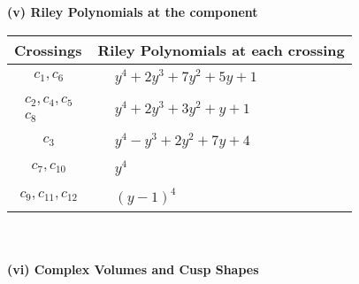 \documentclass[1p]{elsarticle_modified}
\theoremstyle{definition}
\begin{document}
\newpage\renewcommand{\arraystretch}{1}
\flushleft \textbf{(v) Riley Polynomials at the component}\newline \\
\begin{tabular}{m{50pt}|m{274pt}}
Crossings & \hspace{64pt}Riley Polynomials at each crossing \\
\hline $$\begin{aligned}c_{1},c_{6}\end{aligned}$$&$\begin{aligned}
&y^4+2 y^3+7 y^2+5 y+1
\end{aligned}$\\
\hline $$\begin{aligned}c_{2},c_{4},c_{5}\\c_{8}\end{aligned}$$&$\begin{aligned}
&y^4+2 y^3+3 y^2+y+1
\end{aligned}$\\
\hline $$\begin{aligned}c_{3}\end{aligned}$$&$\begin{aligned}
&y^4- y^3+2 y^2+7 y+4
\end{aligned}$\\
\hline $$\begin{aligned}c_{7},c_{10}\end{aligned}$$&$\begin{aligned}
&y^4
\end{aligned}$\\
\hline $$\begin{aligned}c_{9},c_{11},c_{12}\end{aligned}$$&$\begin{aligned}
&(y-1)^4
\end{aligned}$\\
\hline
\end{tabular}\\~\\
\newpage\flushleft \textbf{(vi) Complex Volumes and Cusp Shapes}
\end{document}
